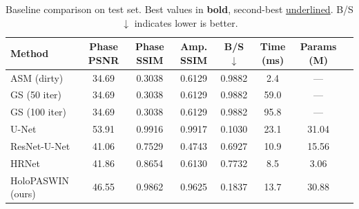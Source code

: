 \begin{table}[h]
\centering
\caption{Baseline comparison on test set. Best values in \textbf{bold}, second-best \underline{underlined}. B/S$\downarrow$ indicates lower is better.}
\label{tab:baseline_comparison}
\small
\begin{tabular}{@{}lccccccc@{}}
\toprule
\textbf{Method} & \textbf{Phase PSNR} & \textbf{Phase SSIM} & \textbf{Amp. SSIM} & \textbf{B/S$\downarrow$} & \textbf{Time (ms)} & \textbf{Params (M)} \\
\midrule
ASM (dirty) & 34.69 & 0.3038 & 0.6129 & 0.9882 & 2.4 & — \\
GS (50 iter) & 34.69 & 0.3038 & 0.6129 & 0.9882 & 59.0 & — \\
GS (100 iter) & 34.69 & 0.3038 & 0.6129 & 0.9882 & 95.8 & — \\
U-Net & 53.91 & 0.9916 & 0.9917 & 0.1030 & 23.1 & 31.04 \\
ResNet-U-Net & 41.06 & 0.7529 & 0.4743 & 0.6927 & 10.9 & 15.56 \\
HRNet & 41.86 & 0.8654 & 0.6130 & 0.7732 & 8.5 & 3.06 \\
HoloPASWIN (ours) & 46.55 & 0.9862 & 0.9625 & 0.1837 & 13.7 & 30.88 \\
\bottomrule
\end{tabular}
\end{table}
